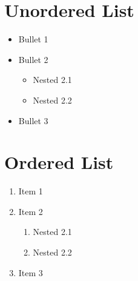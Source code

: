 \documentclass{article}
\begin{document}
\section{Unordered List}
\begin{itemize}
\item Bullet 1
\item Bullet 2
    \begin{itemize}
    \item Nested 2.1
    \item Nested 2.2
    \end{itemize}
\item Bullet 3
\end{itemize}

\section{Ordered List}
\begin{enumerate}
\item Item 1
\item Item 2
    \begin{enumerate}
    \item Nested 2.1
    \item Nested 2.2
    \end{enumerate}
\item Item 3
\end{enumerate}
\end{document}
